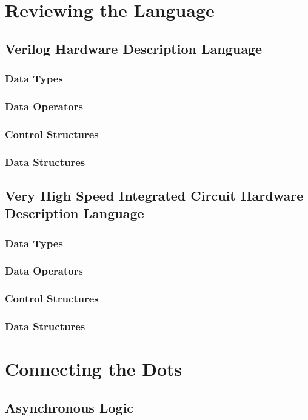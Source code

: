 \documentclass[a4paper,11pt]{book}
\begin{document}
\part{Reviewing the Language}
\chapter[Verilog]{Verilog Hardware Description Language}
\section{Data Types}
\section{Data Operators}
\section{Control Structures}
\section{Data Structures}

\chapter[VHDL]{Very High Speed Integrated Circuit Hardware Description Language}
\section{Data Types}
\section{Data Operators}
\section{Control Structures}
\section{Data Structures}

\part{Connecting the Dots}

\chapter{Asynchronous Logic}
\end{document}
